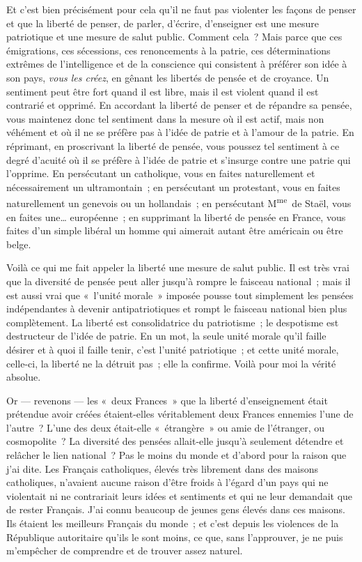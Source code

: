 \documentclass[french,twoside]{book} %
\begin{document}
Et c’est bien précisément pour cela qu’il ne faut pas violenter les façons de penser et que la liberté de penser, de parler, d’écrire, d’enseigner est une mesure patriotique et une mesure de salut public. Comment cela ? Mais parce que ces émigrations, ces sécessions, ces renoncements à la patrie, ces déterminations extrêmes de l’intelligence et de la conscience qui consistent à préférer son idée à son pays, {\itshape vous les créez}, en gênant les libertés de pensée et de croyance. Un sentiment peut être fort quand il est libre, mais il est violent quand il est contrarié et opprimé. En accordant la liberté de penser et de répandre sa pensée, vous maintenez donc tel sentiment dans la mesure où il est actif, mais non véhément et où il ne se préfère pas à l’idée de patrie et à l’amour de la patrie. En réprimant, en proscrivant la liberté de pensée, vous poussez tel sentiment à ce degré d’acuité où il se préfère à l’idée de patrie et s’insurge contre une patrie qui l’opprime. En persécutant  un catholique, vous en faites naturellement et nécessairement un ultramontain ; en persécutant un protestant, vous en faites naturellement un genevois ou un hollandais ; en persécutant M\textsuperscript{me} de Staël, vous en faites une… européenne ; en supprimant la liberté de pensée en France, vous faites d’un simple libéral un homme qui aimerait autant être américain ou être belge.\par
Voilà ce qui me fait appeler la liberté une mesure de salut public. Il est très vrai que la diversité de pensée peut aller jusqu’à rompre le faisceau national ; mais il est aussi vrai que « l’unité morale » imposée pousse tout simplement les pensées indépendantes à devenir antipatriotiques et rompt le faisceau national bien plus complètement. La liberté est consolidatrice du patriotisme ; le despotisme est destructeur de l’idée de patrie. En un mot, la seule unité morale qu’il faille désirer et à quoi il faille tenir, c’est l’unité patriotique ; et cette unité morale, celle-ci, la liberté ne la détruit pas ; elle la confirme. Voilà pour moi la vérité absolue.\par
Or — revenons — les « deux Frances » que la liberté d’enseignement était prétendue avoir créées étaient-elles véritablement deux Frances ennemies l’une de l’autre ? L’une des deux était-elle « étrangère » ou amie de l’étranger, ou cosmopolite ? La diversité des pensées allait-elle jusqu’à seulement  détendre et relâcher le lien national ? Pas le moins du monde et d’abord pour la raison que j’ai dite. Les Français catholiques, élevés très librement dans des maisons catholiques, n’avaient aucune raison d’être froids à l’égard d’un pays qui ne violentait ni ne contrariait leurs idées et sentiments et qui ne leur demandait que de rester Français. J’ai connu beaucoup de jeunes gens élevés dans ces maisons. Ils étaient les meilleurs Français du monde ; et c’est depuis les violences de la République autoritaire qu’ils le sont moins, ce que, sans l’approuver, je ne puis m’empêcher de comprendre et de trouver assez naturel.\par
\end{document}
